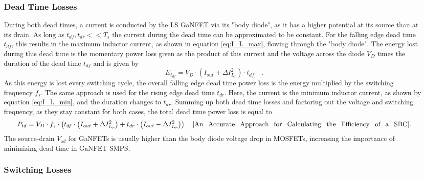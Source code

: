 \subsubsection{Dead Time Losses}
During both dead times, a current is conducted by the \ac{LS} \ac{GaNFET} via its "body diode", as it has a higher potential at its source than at its drain. As long as $t_{df}, t_{dr} << T_s$ the current during the dead time can be approximated to be constant. For the falling edge dead time $t_{df}$, this results in the maximum inductor current, as shown in equation \ref{eq:I_L_max}, flowing through the "body diode". The energy lost during this dead time is the momentary power loss given as the product of this current and the voltage across the diode $V_D$ times the duration of the dead time $t_{df}$ and is given by 
\begin{equation}\label{eq:dead_time_energy}
    E_{t_{df}} = V_D \cdot (I_{out} + \Delta I_{L_r}^2) \cdot t_{df} \quad\text{.}
\end{equation}
As this energy is lost every switching cycle, the overall falling edge dead time power loss is the energy multiplied by the switching frequency $f_s$. The same approach is used for the rising edge dead time $t_{dr}$. Here, the current is the minimum inductor current, as shown by equation \ref{eq:I_L_min}, and the duration changes to $t_{dr}$. Summing up both dead time losses and factoring out the voltage and switching frequency, as they stay constant for both cases, the total dead time power loss is equal to
\begin{equation}\label{eq:dead_time_power_loss}
P_{td} = V_D \cdot f_s \cdot \left(t_{df} \cdot \left(I_{out} + \Delta I_{L_{r}}^2\right) + t_{dr} \cdot \left(I_{out} - \Delta I_{L_{r}}^2\right)\right)    \quad\text{\cite{An_Accurate_Approach_for_Calculating_the_Efficiency_of_a_SBC}.}
\end{equation}
The source-drain $V_{sd}$ for \acp{GaNFET} is usually higher than the body diode voltage drop in \acp{MOSFET}, increasing the importance of minimizing dead time in \ac{GaNFET} \ac{SMPS}\cite{strydomDeadTimeOptimizationMaximum2020}.

\subsubsection{Switching Losses}

